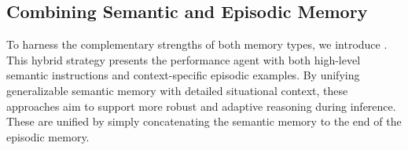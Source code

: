 \subsection{Combining Semantic and Episodic Memory}

To harness the complementary strengths of both memory types, we introduce \EPSEMCRIT{}. This hybrid strategy presents the performance agent with both high-level semantic instructions and context-specific episodic examples. By unifying generalizable semantic memory with detailed situational context, these approaches aim to support more robust and adaptive reasoning during inference. These are unified by simply concatenating the semantic memory to the end of the episodic memory.
